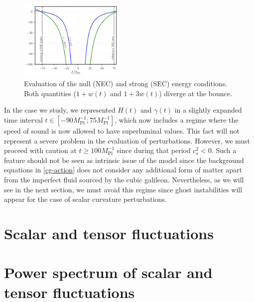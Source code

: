 \documentclass[aps,prd,reprint,twocolumn,showpacs,nofootinbib,superscriptaddress,floatfix]{revtex4-1}
\begin{document}
\begin{figure}
\begin{center}
\includegraphics[width=0.45\textwidth]{NEC_SEC.pdf}
\caption{Evaluation of the null (NEC) and strong (SEC) energy conditions. Both quantities ($1+w(t)$ and $1+3w(t)$) diverge at the bounce.}
\label{fig:NEC_SEC_violation}
\end{center}
\end{figure}

In the case we study, we represented $H(t)$ and $\gamma(t)$ in a slightly expanded time interval $t\in[-90M_{\mathrm{Pl}}^{-1};75M_{\mathrm{Pl}}^{-1}]$, which now includes a regime where the speed of sound is now allowed to have superluminal values. This fact will not represent a severe problem in the evaluation of perturbations. However, we must proceed with caution at $t\geq 100M_{\mathrm{Pl}}^{-1}$ since during that period $c_s^2<0$. Such a feature should not be seen as intrinsic issue of the model since the background equations in \eqref{cg-action} does not consider any additional form of matter apart from the imperfect fluid sourced by the cubic galileon. Nevertheless, as we will see in the next section, we must avoid this regime since ghost instabilities will appear for the case of scalar curvature perturbations.      

\section{Scalar and tensor fluctuations}\label{secIII}
\section{Power spectrum of scalar and tensor fluctuations}\label{secIV}
\end{document}
